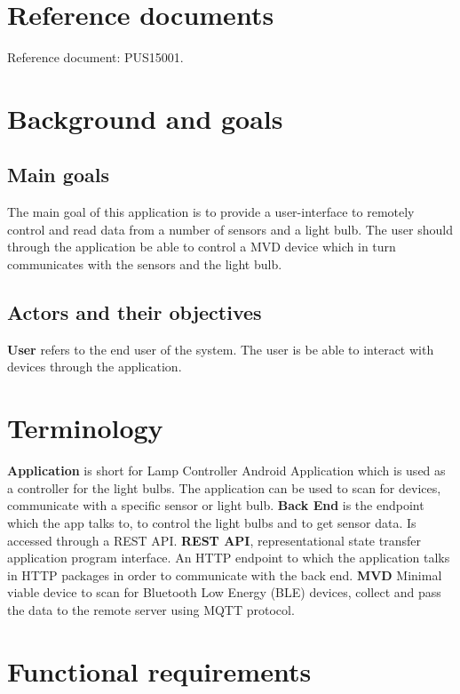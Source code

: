 \documentclass[a4paper]{article}
\begin{document}
\section{Reference documents}
Reference document: PUS15001.
\section{Background and goals}
\subsection{Main goals}
The main goal of this application is to provide a user-interface to remotely control and read data from a number of sensors and a light bulb. The user should through the application be able to control a MVD device which in turn communicates with the sensors and the light bulb.
\subsection{Actors and their objectives}

\textbf{User} refers to the end user of the system. The user is be able to interact with devices through the application. 

\section{Terminology}

\textbf{Application} is short for Lamp Controller Android Application which is used as a controller for the light bulbs. The application can be used to scan for devices, communicate with a specific sensor or light bulb. 
\newline \newline
\textbf{Back End} is the endpoint which the app talks to, to control the light bulbs and to get sensor data. Is accessed through a REST API. 
\newline \newline
\textbf{REST API}, representational state transfer application program interface. An HTTP endpoint to which the application talks in HTTP packages in order to communicate with the back end. 
\newline \newline
\textbf{MVD} Minimal viable device to scan for Bluetooth Low Energy (BLE) devices, collect and pass the data to the remote server using MQTT protocol.
\section{Functional requirements}
\end{document}
